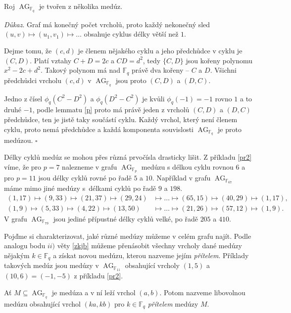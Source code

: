 \documentclass[12pt]{report}
\DeclareMathOperator{\AG}{AG}
\begin{document}
\begin{veta}\label{meduzy}
Roj $\AG_{\mathbb{F}_q}$ je tvořen z několika medúz.
\end{veta}
\noindent \textit{Důkaz}. Graf má konečný počet vrcholů, proto každý nekonečný sled $(u,v) \longmapsto (u_1,v_1) \longmapsto \dots$ obsahuje cyklus délky větší než $1$.

Dejme tomu, že $(c,d)$ je členem nějakého cyklu a jeho předchůdce v cyklu je $(C,D)$. Platí vztahy $C+D=2c$ a $CD = d^2$, tedy $\lbrace C,D \rbrace$ jsou kořeny polynomu $x^2-2c+d^2$. Takový polynom má nad $\mathbb{F}_q$ právě dva kořeny -- $C$ a $D$. Všichni předchůdci vrcholu $(c,d)$ v $\AG_{\mathbb{F}_q}$ jsou proto $(C,D)$ a $(D,C)$. 

Jedno z čísel $\phi_q (C^2 - D^2)$ a $\phi_q(D^2-C^2)$ je kvůli $\phi_q(-1)=-1$ rovno $1$ a to druhé $-1$, podle lemmatu \ref{p} proto má právě jeden z vrcholů  $(C,D)$ a $(D,C)$ předchůdce, ten je jistě taky součástí cyklu. Každý vrchol, který není členem cyklu, proto nemá předchůdce a každá komponenta souvislosti $\AG_{\mathbb{F}_q}$ je proto medúzou. \hfill $\square$\\

\begin{priklad}\label{pr3}
Délky cyklů medúz se mohou přes různá prvočísla drasticky lišit. Z příkladu \ref{pr2} víme, že pro $p = 7$ nalezneme v grafu $\AG_{\mathbb{F}_p}$ medúzu s délkou cyklu rovnou $6$ a pro $p=11$ jsou délky cyklů rovné po řadě $5$ a $10$. Například v grafu $\AG_{\mathbb{F}_{67}}$ máme mimo jiné medúzy s~délkami cyklů po řadě $9$ a $198$.
\begin{align*}
(1,17) \mapsto (9,33) \mapsto (21,37) \mapsto (29,24) &\mapsto \dots \mapsto (65,15) \mapsto (40,29) \mapsto (1,17),\\
(1,9) \mapsto (5,33) \mapsto (4,22) \mapsto (13,50) &\mapsto \dots \mapsto (21,26) \mapsto (57,12) \mapsto (1,9).
\end{align*}
V grafu $\AG_{\mathbb{F}_{79}}$ jsou jediné přípustné délky cyklů velké, po řadě $205$ a $410$.
\end{priklad}

Pojďme si charakterizovat, jaké různé medúzy můžeme v celém grafu najít. Podle analogu bodu $ii)$ věty \ref{zkjb} můžeme přenásobit všechny vrcholy dané medúzy nějakým $k \in \mathbb{F}_q$ a získat novou medúzu, kterou nazveme jejím \textit{přítelem}. Příklady takových medúz jsou medúzy v $\AG_{\mathbb{F}_{11}}$ obsahující vrcholy $(1,5)$ a $(10,6) = (-1,-5)$ z příkladu \ref{pr2}.
\begin{definice}
Ať $M \subseteq \AG_{\mathbb{F}_q}$ je medúza a v ní leží vrchol $(a,b)$. Potom nazveme libovolnou medúzu obsahující vrchol $(ka,kb)$ pro $k \in \mathbb{F}_q$ \textit{přítelem} medúzy $M$.
\end{definice}
\end{document}
